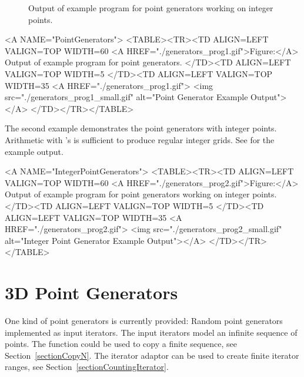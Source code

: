 \begin{ccTexOnly}
\begin{figure}
\begin{minipage}{0.45\textwidth}
      \caption{Output of example program for point generators working
        on integer points.}
      \label{figureIntegerPointGenerator}
    \end{minipage}%
  \end{figure}
\end{ccTexOnly}

\begin{ccHtmlOnly}
  <A NAME="PointGenerators">
  <TABLE><TR><TD ALIGN=LEFT VALIGN=TOP WIDTH=60%
    <A HREF="./generators_prog1.gif">Figure:</A>
    Output of example program for point generators.
  </TD><TD ALIGN=LEFT VALIGN=TOP WIDTH=5%
  </TD><TD ALIGN=LEFT VALIGN=TOP WIDTH=35%
    <A HREF="./generators_prog1.gif">
        <img src="./generators_prog1_small.gif" 
             alt="Point Generator Example Output"></A>
  </TD></TR></TABLE>
\end{ccHtmlOnly}


The second example demonstrates the point generators with integer
points. Arithmetic with 's is sufficient to produce
regular integer grids. See 
for the example output.


\begin{ccHtmlOnly}
  <A NAME="IntegerPointGenerators">
  <TABLE><TR><TD ALIGN=LEFT VALIGN=TOP WIDTH=60%
    <A HREF="./generators_prog2.gif">Figure:</A>
        Output of example program for point generators working
        on integer points.
  </TD><TD ALIGN=LEFT VALIGN=TOP WIDTH=5%
  </TD><TD ALIGN=LEFT VALIGN=TOP WIDTH=35%
    <A HREF="./generators_prog2.gif">
        <img src="./generators_prog2_small.gif" 
             alt="Integer Point Generator Example Output"></A>
  </TD></TR></TABLE>
\end{ccHtmlOnly}


\newpage
\section{3D Point Generators}

One kind of point generators is currently provided: Random point
generators implemented as input iterators.  The input iterators model
an infinite sequence of points. The function  could
be used to copy a finite sequence, see Section~\ref{sectionCopyN}. The
iterator adaptor  can be used to create
finite iterator ranges, see Section~\ref{sectionCountingIterator}.


